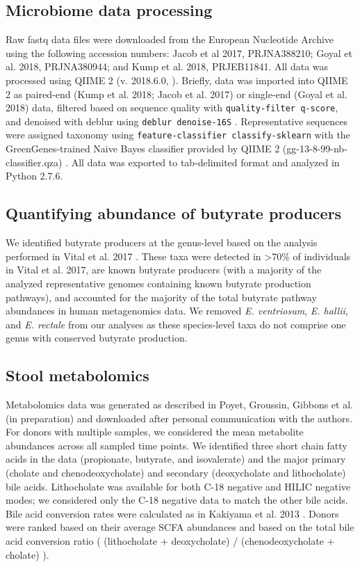 \subsection{Microbiome data processing}

Raw fastq data files were downloaded from the European Nucleotide Archive using the following accession numbers: Jacob et al 2017, PRJNA388210; Goyal et al. 2018, PRJNA380944; and Kump et al. 2018, PRJEB11841.
All data was processed using QIIME 2 (v. 2018.6.0, \cite{qiime2}).
Briefly, data was imported into QIIME 2 as paired-end (Kump et al. 2018; Jacob et al. 2017) or single-end (Goyal et al. 2018) data, filtered based on sequence quality with \texttt{quality-filter q-score}, and denoised with deblur using \texttt{deblur denoise-16S} \cite{deblur}.
Representative sequences were assigned taxonomy using \texttt{feature-classifier classify-sklearn} with the GreenGenes-trained Naive Bayes classifier provided by QIIME 2 (gg-13-8-99-nb-classifier.qza) \cite{feature-classifier}.
All data was exported to tab-delimited format and analyzed in Python 2.7.6.

\subsection{Quantifying abundance of butyrate producers}

We identified butyrate producers at the genus-level based on the analysis performed in Vital et al. 2017 \cite{Vital2017}.
These taxa were detected in >70\% of individuals in Vital et al. 2017, are known butyrate producers (with a majority of the analyzed representative genomes containing known butyrate production pathways), and accounted for the majority of the total butyrate pathway abundances in human metagenomics data.
We removed \textit{E. ventriosum}, \textit{E. hallii}, and \textit{E. rectale} from our analyses as these species-level taxa do not comprise one genus with conserved butyrate production.

\subsection{Stool metabolomics}

Metabolomics data was generated as described in Poyet, Groussin, Gibbons et al. (in preparation) and downloaded after personal communication with the authors.
For donors with multiple samples, we considered the mean metabolite abundances across all sampled time points.
We identified three short chain fatty acids in the data (propionate, butyrate, and isovalerate) and the major primary (cholate and chenodeoxycholate) and secondary (deoxycholate and lithocholate) bile acids.
Lithocholate was available for both C-18 negative and HILIC negative modes; we considered only the C-18 negative data to match the other bile acids.
Bile acid conversion rates were calculated as in Kakiyama et al. 2013 \cite{Kakiyama2013}.
Donors were ranked based on their average SCFA abundances and based on the total bile acid conversion ratio ( (lithocholate + deoxycholate) / (chenodeoxycholate + cholate) ).

